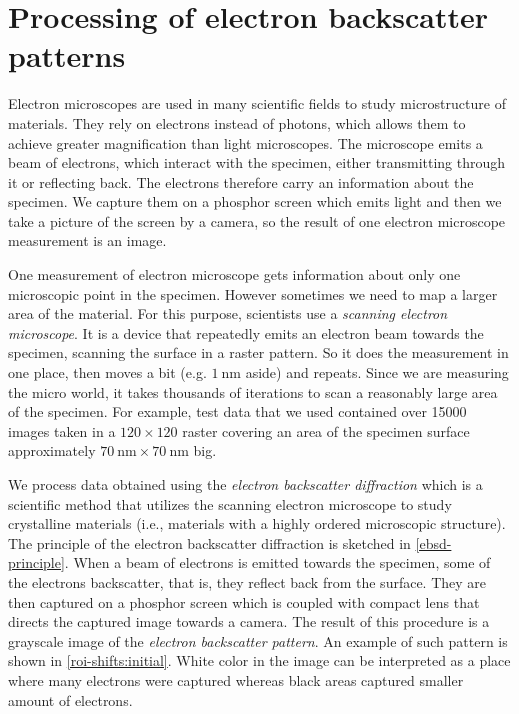 \chapter{Processing of electron backscatter patterns}
\label{chap1}

Electron microscopes are used in many scientific fields to study microstructure of materials. They rely on electrons instead of photons, which allows them to achieve greater magnification than light microscopes. The microscope emits a beam of electrons, which interact with the specimen, either transmitting through it or reflecting back. The electrons therefore carry an information about the specimen. We capture them on a phosphor screen which emits light and then we take a picture of the screen by a camera, so the result of one electron microscope measurement is an image.

One measurement of electron microscope gets information about only one microscopic point in the specimen. However sometimes we need to map a larger area of the material. For this purpose, scientists use a \emph{scanning electron microscope}. It is a device that repeatedly emits an electron beam towards the specimen, scanning the surface in a raster pattern. So it does the measurement in one place, then moves a bit (e.g. $\SI{1}{\nano\meter}$ aside) and repeats. Since we are measuring the micro world, it takes thousands of iterations to scan a reasonably large area of the specimen. For example, test data that we used contained over 15000 images taken in a $120 \times 120$ raster covering an area of the specimen surface approximately $\SI{70}{\nano\meter} \times \SI{70}{\nano\meter}$ big.

We process data obtained using the \emph{electron backscatter diffraction} which is a scientific method that utilizes the scanning electron microscope to study crystalline materials (i.e., materials with a highly ordered microscopic structure). The principle of the electron backscatter diffraction is sketched in \cref{ebsd-principle}. When a beam of electrons is emitted towards the specimen, some of the electrons backscatter, that is, they reflect back from the surface. They are then captured on a phosphor screen which is coupled with compact lens that directs the captured image towards a camera. The result of this procedure is a grayscale image of the \emph{electron backscatter pattern}. An example of such pattern is shown in \cref{roi-shifts:initial}. White color in the image can be interpreted as a place where many electrons were captured whereas black areas captured smaller amount of electrons.


